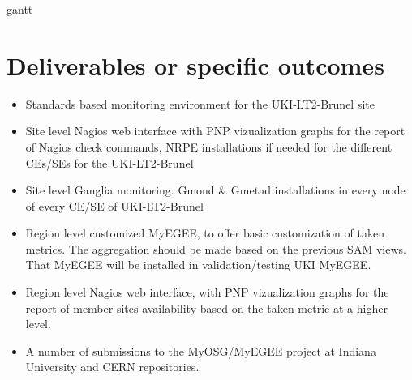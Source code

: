 \documentclass[a4paper,12pt,oneside]{book}
\begin{document}
 {gantt}
\pagebreak
\section[Deliverables]{Deliverables or specific outcomes}

\begin{itemize}
  \item Standards based monitoring environment for the UKI-LT2-Brunel site
  \item Site level Nagios web interface with PNP vizualization graphs for the
  report of Nagios check commands, NRPE installations if needed for the
  different CEs/SEs for the UKI-LT2-Brunel
  \item Site level Ganglia monitoring. Gmond \& Gmetad installations in every
  node of every CE/SE of UKI-LT2-Brunel
  \item Region level customized MyEGEE, to offer basic customization of taken
  metrics. The aggregation should be made based on the previous SAM views. That
  MyEGEE will be installed in validation/testing UKI MyEGEE.
  \item Region level Nagios web interface, with PNP vizualization graphs for the
  report of member-sites availability based on the taken metric at a higher
  level.
  \item A number of submissions to the MyOSG/MyEGEE project at Indiana
  University and CERN repositories.
\end{itemize}




\backmatter



\end{document}
